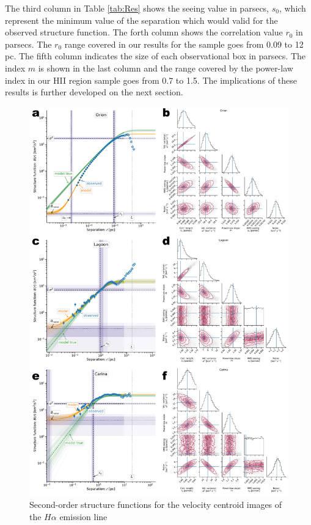 \documentclass[fleqn,usenatbib, useAMS, a4paper]{mnras}
\begin{document}
The third column in Table \ref{tab:Res} shows the seeing value in parsecs, \(s_0\), which represent the minimum value of the separation which would valid for the observed structure function. 
The forth column shows the correlation value \(r_0\) in parsecs.
The \(r_0\) range covered in our results for the sample goes from 0.09 to 12 pc.
The fifth column indicates the size of each observational box in parsecs.
The index \(m\) is shown in the last column and the range covered by the power-law index in our HII region sample goes from 0.7 to 1.5.
The implications of these results is further developed on the next section.

\begin{figure}
  \centering
  \includegraphics[width=0.8\linewidth]{Figures/strucfunc-fit-A}
  \caption{Second-order structure functions for the velocity centroid images of the \(H\alpha\) emission line}\label{fig:strucfunc-fit-A}
\end{figure}
\end{document}
